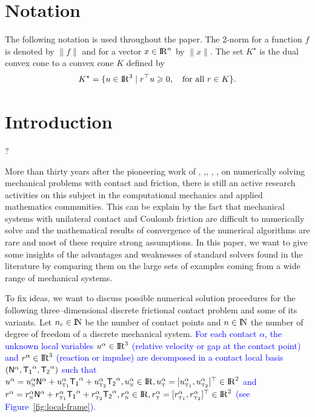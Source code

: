 \newcommand{\tb}[1]{\textcolor{blue}{#1}}
\section*{Notation}

The following notation is used throughout the paper. The 2-norm for a function $f$ is denoted  by $\|f\|$ and for a vector $x\in\mathrm{I\!R}^n$ by $\|x\|$. 
The set $ K^\star $ is the dual convex cone to a convex cone $K$ defined by
\begin{equation}
  \label{eq:dual-cone}
  K^\star = \{u \in \RR^3 \mid  r^\top u \geq 0, \quad \text{for all } r \in K   \}.
\end{equation}
\section{Introduction}

\citet{Panagiotopoulos_IA1975} ?

More than thirty years after the pioneering work of \cite{Necas.ea1980}, \cite{Haslinger1983,Haslinger1984},\cite{Katona_IJNAMG1983}, \cite{Chaudhary.Bathe_CS1986}, \cite{Jean.Moreau1987}, \cite{Mitsopoulou.Doudoumis1988} on numerically solving mechanical problems with contact and friction, there is still an active research activities on this subject in the computational mechanics and applied mathematics communities.  This can be explain by the fact that  mechanical systems with unilateral contact and Coulomb friction are difficult to numerically solve and the mathematical results of convergence of the numerical algorithms are rare and most of these require strong assumptions. In this paper, we want to give some insights of the advantages and weaknesses of standard solvers found in the literature by comparing them on the large sets of examples coming from a wide range of mechanical systems.

To fix ideas, we want to discuss possible numerical solution procedures for the following three--dimensional discrete frictional contact problem and some of its variants.  Let $n_c\in \mathrm{I\!N}$ be the number of contact points and $n\in\mathrm{I\!N}$ the number of degree of freedom of a discrete mechanical system.  \tb{For each contact $\alpha$, the unknown local variables  $u^\alpha\in\mathrm{I\!R}^3$ (relative velocity or gap at the contact point) and $r^\alpha\in\mathrm{I\!R}^3$ (reaction or impulse) are decomposed  in a contact local basis $({\sf N}^\alpha,{\sf T_1}^\alpha,{\sf T_2}^\alpha)$ such that $u^\alpha = u^\alpha_{{\hbox{\tiny{N}}}} {\sf N}^\alpha +   u^{\alpha}_{{\hbox{\tiny{T}}}_{\hbox{\tiny{1}}}}{\sf T_1}^\alpha + u^{\alpha}_{{\hbox{\tiny{T}}}_{\hbox{\tiny{2}}}}{\sf T_2}^\alpha , u^\alpha_{{\hbox{\tiny{N}}}} \in \mathrm{I\!R}, u^\alpha_{{\hbox{\tiny{T}}}} = [u^{\alpha}_{{\hbox{\tiny{T}}}_{\hbox{\tiny{1}}}},u^{\alpha}_{{\hbox{\tiny{T}}}_{\hbox{\tiny{2}}}}]^\top \in \mathrm{I\!R}^2$ and  $r^\alpha = r^\alpha_{{\hbox{\tiny{N}}}} {\sf N}^\alpha +   r^{\alpha}_{{\hbox{\tiny{T}}}_{\hbox{\tiny{1}}}}{\sf T_1}^\alpha + r^{\alpha}_{{\hbox{\tiny{T}}}_{\hbox{\tiny{2}}}}{\sf T_2}^\alpha  , r^\alpha_{{\hbox{\tiny{N}}}} \in \mathrm{I\!R}, r^\alpha_{{\hbox{\tiny{T}}}}=[r^{\alpha}_{{\hbox{\tiny{T}}}_{\hbox{\tiny{1}}}},r^{\alpha}_{{\hbox{\tiny{T}}}_{\hbox{\tiny{2}}}}]^\top \in \mathrm{I\!R}^2$ (see Figure~\ref{fig:local-frame}).}

